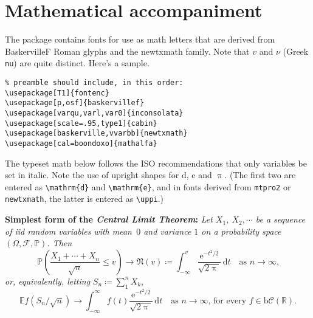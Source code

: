 \documentclass[11pt]{article}
\begin{document}
\section*{Mathematical accompaniment}
The package contains fonts for use as math letters that are derived from BaskervilleF Roman  glyphs and the newtxmath family. Note that $v$ and $\nu$ (Greek {\tt nu}) are quite distinct. Here's a sample.

\begin{verbatim}
% preamble should include, in this order:
\usepackage[T1]{fontenc}
\usepackage[p,osf]{baskervillef}
\usepackage[varqu,varl,var0]{inconsolata}
\usepackage[scale=.95,type1]{cabin}
\usepackage[baskerville,vvarbb]{newtxmath}
\usepackage[cal=boondoxo]{mathalfa}
\end{verbatim}
\def\Pr{\ensuremath{\mathbb{P}}}
\def\d{\mathrm{d}}
The typeset math below follows the ISO recommendations that only variables
be set in italic. Note the use of upright shapes for $\d$, $\mathrm{e}$
and $\uppi$. (The first two are entered as \verb|\mathrm{d}| and
\verb|\mathrm{e}|, and in fonts derived from {\tt mtpro2} or {\tt newtxmath},
 the latter is entered as \verb|\uppi|.)

\textbf{Simplest form of the \textit{Central Limit Theorem}:} \textit{Let
$X_1$, $X_2,\cdots$ be a sequence of iid random variables with mean~$0$ 
and variance $1$ on a probability space $(\Omega,\mathcal{F},\Pr)$. Then}
\[\Pr\left(\frac{X_1+\cdots+X_n}{\sqrt{n}}\le v\right)\to\mathfrak{N}(v)\coloneq
\int_{-\infty}^v \frac{\mathrm{e}^{-t^2/2}}{\sqrt{2\uppi}}\,
\mathrm{d}t\quad\mbox{as $n\to\infty$,}\]
\textit{or, equivalently, letting} $S_n\coloneq\sum_1^n X_k$,
\[\mathbb{E} f\left(S_n/\sqrt{n}\right)\to \int_{-\infty}^\infty f(t)
\frac{\mathrm{e}^{-t^2/2}}{\sqrt{2\uppi}}\,\mathrm{d}t
\quad\mbox{as $n\to\infty$, for every $f\in\mathrm{b}
\mathcal{C}(\mathbb{R})$.}\]

\end{document}
